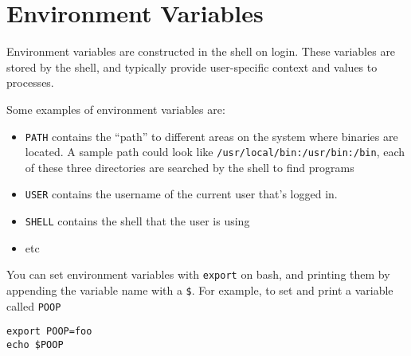 
\section{Environment Variables}

Environment variables are constructed in the shell on login. These variables are
stored by the shell, and typically provide user-specific context and values to
processes.

Some examples of environment variables are:
\begin{itemize}
\item \texttt{PATH} contains the ``path'' to different areas on the system where
  binaries are located. A sample path could look like
  \texttt{/usr/local/bin:/usr/bin:/bin}, each of these three directories are
  searched by the shell to find programs
\item \texttt{USER} contains the username of the current user that's logged
    in.
  \item 
    \texttt{SHELL} contains the shell that the user is using
\item etc
\end{itemize}

You can set environment variables with \texttt{export} on bash, and printing
them by appending the variable name with a \texttt{\$}. For example, to set and
print a variable called \texttt{POOP}

\begin{verbatim}
export POOP=foo
echo $POOP
\end{verbatim}

